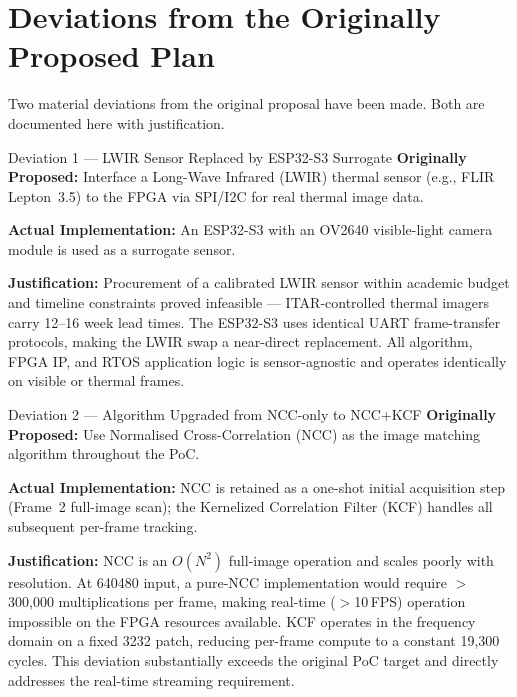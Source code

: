 \documentclass[12pt,a4paper]{article}
\begin{document}
\section{Deviations from the Originally Proposed Plan}

Two material deviations from the original proposal have been made. Both are documented here with justification.

\begin{reportbox}{Deviation 1 --- LWIR Sensor Replaced by ESP32-S3 Surrogate}
\textbf{Originally Proposed:} Interface a Long-Wave Infrared (LWIR) thermal sensor (e.g., FLIR Lepton~3.5) to the FPGA via SPI/I2C for real thermal image data.

\smallskip
\textbf{Actual Implementation:} An ESP32-S3 with an OV2640 visible-light camera module is used as a surrogate sensor.

\smallskip
\textbf{Justification:} Procurement of a calibrated LWIR sensor within academic budget and timeline constraints proved infeasible --- ITAR-controlled thermal imagers carry 12--16 week lead times. The ESP32-S3 uses identical UART frame-transfer protocols, making the LWIR swap a near-direct replacement. All algorithm, FPGA IP, and RTOS application logic is sensor-agnostic and operates identically on visible or thermal frames.
\end{reportbox}

\begin{reportbox}{Deviation 2 --- Algorithm Upgraded from NCC-only to NCC+KCF}
\textbf{Originally Proposed:} Use Normalised Cross-Correlation (NCC) as the image matching algorithm throughout the PoC.

\smallskip
\textbf{Actual Implementation:} NCC is retained as a one-shot initial acquisition step (Frame~2 full-image scan); the Kernelized Correlation Filter (KCF) handles all subsequent per-frame tracking.

\smallskip
\textbf{Justification:} NCC is an $O(N^2)$ full-image operation and scales poorly with resolution. At 640\texttimes{}480 input, a pure-NCC implementation would require $>$300,000 multiplications per frame, making real-time ($>$10\,FPS) operation impossible on the FPGA resources available. KCF operates in the frequency domain on a fixed 32\texttimes{}32 patch, reducing per-frame compute to a constant 19,300 cycles. This deviation substantially exceeds the original PoC target and directly addresses the real-time streaming requirement.
\end{reportbox}
\end{document}
